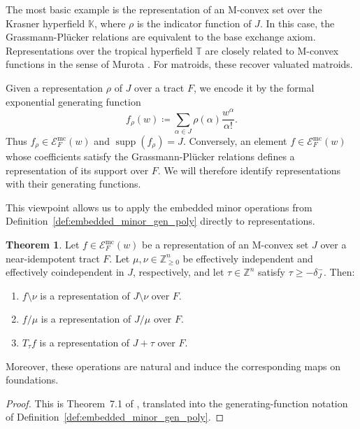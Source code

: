 \documentclass[11pt]{article}
\theoremstyle{definition}
\newtheorem{theorem}{Theorem}[section]
\theoremstyle{remark}
\newcommand{\Zgeqn}{\mathbb{Z}_{\geq 0}^n}     %
\newcommand{\delminus}{\delta_J^-}
\DeclareMathOperator{\supp}{supp}
\begin{document}
The most basic example is the representation of an M-convex set over the Krasner hyperfield $\mathbb{K}$, where $\rho$ is the indicator function of $J$. In this case, the Grassmann-Pl\"ucker relations are equivalent to the base exchange axiom. Representations over the tropical hyperfield $\mathbb{T}$ are closely related to M-convex functions in the sense of Murota \cite{murotaDiscreteConvexAnalysis2003}. For matroids, these recover valuated matroids.

Given a representation $\rho$ of $J$ over a tract $F$, we encode it by the formal exponential generating function
\[
    f_\rho(w)
    \coloneqq
    \sum_{\alpha\in J}
    \rho(\alpha)\frac{w^\alpha}{\alpha!}.
\]
Thus $f_\rho\in\mathcal{E}^{\mathrm{mc}}_F(w)$ and $\supp(f_\rho)=J$. Conversely, an element $f\in\mathcal{E}^{\mathrm{mc}}_F(w)$ whose coefficients satisfy the Grassmann-Pl\"ucker relations defines a representation of its support over $F$. We will therefore identify representations with their generating functions.

This viewpoint allows us to apply the embedded minor operations from Definition~\ref{def:embedded_minor_gen_poly} directly to representations. 

\begin{theorem}\label{theorem:embedded_minors_preserve_representations}
    Let $f\in\mathcal{E}^{\mathrm{mc}}_F(w)$ be a representation of an M-convex set $J$ over a near-idempotent tract $F$. Let $\mu,\nu\in\Zgeqn$ be effectively independent and effectively coindependent in $J$, respectively, and let $\tau\in\mathbb{Z}^n$ satisfy $\tau\geq-\delminus$. Then:
    \begin{enumerate}
        \item $f\setminus\nu$ is a representation of $J\setminus\nu$ over $F$.
        \item $f/\mu$ is a representation of $J/\mu$ over $F$.
        \item $T_\tau f$ is a representation of $J+\tau$ over $F$.
    \end{enumerate}
    Moreover, these operations are natural and induce the corresponding maps on foundations.
\end{theorem}

\begin{proof}
    This is Theorem~7.1 of \cite{baker2025representationtheorypolymatroids}, translated into the generating-function notation of Definition~\ref{def:embedded_minor_gen_poly}.
\end{proof}
\end{document}
